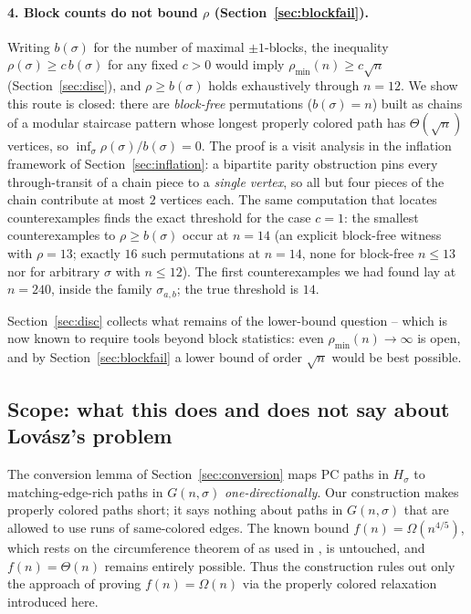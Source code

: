 \documentclass[11pt]{article}
\theoremstyle{definition}
\newcommand{\pmin}{\rho_{\min}}
\begin{document}
\paragraph{4. Block counts do not bound $\rho$ (Section~\ref{sec:blockfail}).}
Writing $b(\sigma)$ for the number of maximal $\pm1$-blocks, the inequality
$\rho(\sigma) \ge c\,b(\sigma)$ for any fixed $c > 0$ would imply
$\pmin(n) \ge c\sqrt n$ (Section~\ref{sec:disc}), and $\rho \ge b(\sigma)$ holds
exhaustively through $n = 12$. We show this route is closed: there are
\emph{block-free} permutations ($b(\sigma) = n$) built as chains of a modular
staircase pattern whose longest properly colored path has $\Theta(\sqrt n)$ vertices,
so $\inf_\sigma \rho(\sigma)/b(\sigma) = 0$. The proof is a visit analysis in the
inflation framework of Section~\ref{sec:inflation}: a bipartite parity obstruction
pins every through-transit of a chain piece to a \emph{single vertex}, so all but four
pieces of the chain contribute at most $2$ vertices each. The same computation that
locates counterexamples finds the exact threshold for the case $c = 1$: the smallest
counterexamples to $\rho \ge b(\sigma)$ occur at $n = 14$ (an explicit block-free
witness with $\rho = 13$; exactly $16$ such permutations at $n = 14$, none for
block-free $n \le 13$ nor for arbitrary $\sigma$ with $n \le 12$). The first
counterexamples we had found lay at $n = 240$, inside the family $\sigma_{a,b}$; the
true threshold is $14$.

Section~\ref{sec:disc} collects what remains of the lower-bound question -- which is
now known to require tools beyond block statistics: even $\pmin(n) \to \infty$ is
open, and by Section~\ref{sec:blockfail} a lower bound of order $\sqrt n$ would be
best possible.

\subsection{Scope: what this does and does not say about Lov\'asz's
problem}\label{subsec:scope}

The conversion lemma of Section~\ref{sec:conversion} maps PC paths in $H_\sigma$ to
matching-edge-rich paths in $G(n,\sigma)$ \emph{one-directionally}. Our construction
makes properly colored paths short; it says nothing about paths in $G(n,\sigma)$ that
are allowed to use runs of same-colored edges. The known bound
$f(n) = \Omega(n^{4/5})$, which rests on the circumference theorem of \cite{LYZ18} as
used in \cite{NSTW25}, is untouched, and $f(n) = \Theta(n)$ remains entirely possible.
Thus the construction rules out only the approach of proving $f(n) = \Omega(n)$ via the
properly colored relaxation introduced here.
\end{document}
